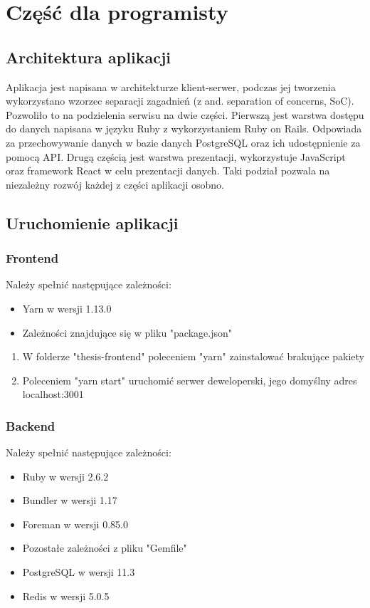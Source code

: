 \documentclass[declaration,shortabstract]{iithesis}
\begin{document}
\chapter{Część dla programisty}
\section{Architektura aplikacji}
Aplikacja jest napisana w architekturze klient-serwer, podczas jej tworzenia wykorzystano wzorzec separacji  zagadnień (z and. separation of concerns, SoC). Pozwoliło to na podzielenia serwisu na dwie części. Pierwszą jest warstwa dostępu do danych napisana w języku Ruby z wykorzystaniem Ruby on Rails. Odpowiada za przechowywanie danych w bazie danych PostgreSQL oraz ich udostępnienie za pomocą API. Drugą częścią jest warstwa prezentacji, wykorzystuje JavaScript oraz framework React w celu prezentacji danych. Taki podział pozwala na niezależny rozwój każdej z części aplikacji osobno.

\section{Uruchomienie aplikacji}

\subsection{Frontend}

Należy spełnić następujące zależności:
    \begin{itemize}
        \item Yarn w wersji 1.13.0
        \item Zależności znajdujące się w pliku "package.json" 
    \end{itemize}

\begin{enumerate}
    \item W folderze "thesis-frontend" poleceniem "yarn" zainstalować brakujące pakiety
    \item Poleceniem "yarn start" uruchomić serwer deweloperski, jego domyślny adres localhost:3001
\end{enumerate}

\subsection{Backend}
Należy spełnić następujące zależności:
        \begin{itemize}
            \item Ruby w wersji 2.6.2
            \item Bundler w wersji 1.17
            \item Foreman w wersji 0.85.0
            \item Pozostałe zależności z pliku "Gemfile"
            \item PostgreSQL w wersji 11.3
            \item Redis w wersji 5.0.5
        \end{itemize}
\end{document}
